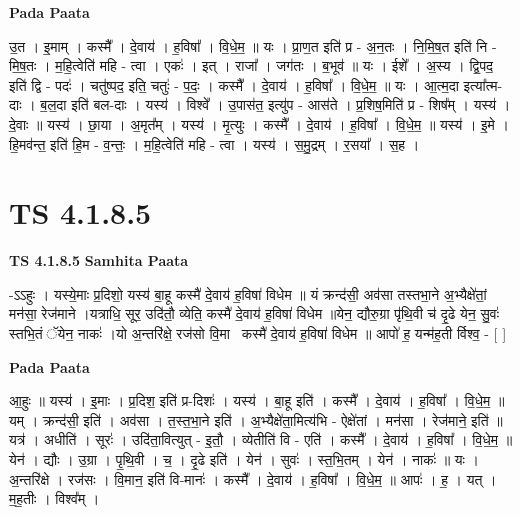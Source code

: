 \documentclass[17pt]{extarticle}
\begin{document}
\textbf{Pada Paata} \newline

उ॒त । इ॒माम् । कस्मै᳚ । दे॒वाय॑ । ह॒विषा᳚ । वि॒धे॒म॒ ॥ यः । प्रा॒ण॒त इति॑ प्र - अ॒न॒तः । नि॒मि॒ष॒त इति॑ नि - मि॒ष॒तः । म॒हि॒त्वेति॑ महि - त्वा । एकः॑ । इत् । राजा᳚ । जग॑तः । ब॒भूव॑ ॥ यः । ईशे᳚ । अ॒स्य । द्वि॒पद॒ इति॑ द्वि - पदः॑ । चतु॑ष्पद॒ इति॒ चतुः॑ - प॒दः॒ । कस्मै᳚ । दे॒वाय॑ । ह॒विषा᳚ । वि॒धे॒म॒ ॥ यः । आ॒त्म॒दा इत्या᳚त्म-दाः । ब॒ल॒दा इति॑ बल-दाः । यस्य॑ । विश्वे᳚ । उ॒पास॑त॒ इत्यु॑प - आस॑ते । प्र॒शिष॒मिति॑ प्र - शिष᳚म् । यस्य॑ । दे॒वाः ॥ यस्य॑ । छा॒या । अ॒मृत᳚म् । यस्य॑ । मृ॒त्युः । कस्मै᳚ । दे॒वाय॑ । ह॒विषा᳚ । वि॒धे॒म॒ ॥ यस्य॑ । इ॒मे । हि॒मव॑न्त॒ इति॑ हि॒म - व॒न्तः॒ । म॒हि॒त्वेति॑ महि - त्वा । यस्य॑ । स॒मु॒द्रम् । र॒सया᳚ । स॒ह ।  \newline





\section{ TS 4.1.8.5 }

\textbf{TS 4.1.8.5 } \newline
\textbf{Samhita Paata} \newline

-ऽऽहुः । यस्ये॒माः प्र॒दिशो॒ यस्य॑ बा॒हू कस्मै॑ दे॒वाय॑ ह॒विषा॑ विधेम ॥ यं क्रन्द॑सी॒ अव॑सा तस्तभा॒ने अ॒भ्यैक्षे॑तां॒ मन॑सा॒ रेज॑माने ।यत्राधि॒ सूर॒ उदि॑तौ॒ व्येति॒ कस्मै॑ दे॒वाय॑ ह॒विषा॑ विधेम ॥येन॒ द्यौरु॒ग्रा पृ॑थि॒वी च॑ दृ॒ढे येन॒ सु॒वः॑ स्तभि॒तं ॅयेन॒ नाकः॑ ।यो अ॒न्तरि॑क्षे॒ रज॑सो वि॒मानः᳡कस्मै॑ दे॒वाय॑ ह॒विषा॑ विधेम ॥ आपो॑ ह॒ यन्म॑ह॒ती र्विश्व॒ - [  ] \newline

\textbf{Pada Paata} \newline

आ॒हुः ॥ यस्य॑ । इ॒माः । प्र॒दिश॒ इति॑ प्र-दिशः॑ । यस्य॑ । बा॒हू इति॑ । कस्मै᳚ । दे॒वाय॑ । ह॒विषा᳚ । वि॒धे॒म॒ ॥ यम् । क्रन्द॑सी॒ इति॑ । अव॑सा । त॒स्त॒भा॒ने इति॑ । अ॒भ्यैक्षे॑ता॒मित्य॑भि - ऐक्षे॑तां । मन॑सा । रेज॑माने॒ इति॑ ॥ यत्र॑ । अधीति॑ । सूरः॑ । उदि॑ता॒वित्युत् - इ॒तौ॒ । व्येतीति॑ वि - एति॑ । कस्मै᳚ । दे॒वाय॑ । ह॒विषा᳚ । वि॒धे॒म॒ ॥ येन॑ । द्यौः । उ॒ग्रा । पृ॒थि॒वी । च॒ । दृ॒ढे इति॑ । येन॑ । सुवः॑ । स्त॒भि॒तम् । येन॑ । नाकः॑ ॥ यः । अ॒न्तरि॑क्षे । रज॑सः । वि॒मान॒ इति॑ वि-मानः॑ । कस्मै᳚ । दे॒वाय॑ । ह॒विषा᳚ । वि॒धे॒म॒ ॥ आपः॑ । ह॒ । यत् । म॒ह॒तीः । विश्व᳚म् ।  \newline
\end{document}
